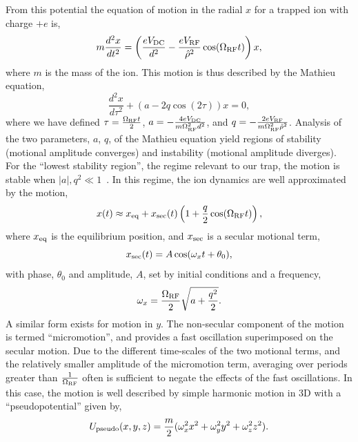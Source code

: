From this potential the equation of motion in the radial $x$ for a trapped ion with charge $+e$ is,
\begin{equation}
    m\frac{d^2x}{d t^2} =  \left(\frac{eV_{\rm DC}}{d^2}-\frac{eV_{\rm RF}}{\hat\rho^2}\cos(\Omega_{\rm RF}t)\right)x,
\end{equation}
where $m$ is the mass of the ion. This motion is thus described by the Mathieu equation,
\begin{equation}
    \frac{d^2x}{d \tau^2} + (a - 2q\cos(2\tau))x = 0,
\end{equation}
where we have defined $\tau = \frac{\Omega_{\rm RF}t}{2}$, $a=-\frac{4eV_{\rm DC}}{m\Omega_{\rm RF}^2d^2}$, and $q=-\frac{2eV_{\rm RF}}{m\Omega_{\rm RF}^2\hat\rho^2}$. 
Analysis of the two parameters, $a$, $q$, of the Mathieu equation yield regions of stability (motional amplitude converges) and instability (motional amplitude diverges). For the ``lowest stability region'', the regime relevant to our trap, the motion is stable when $|a|,q^2\ll 1$~\cite{leibfried_quantum_2003}.
In this regime, the ion dynamics are well approximated by the motion,
\begin{equation}
    x(t) \approx x_{\rm eq} +  x_{\rm sec}(t)\left(1+\frac{q}{2}\cos(\Omega_{\rm RF}t)\right),
\end{equation}
where $x_{\rm eq}$ is the equilibrium position, and $x_{\rm sec}$ is a secular motional term,
\begin{equation}
    \label{eqn:secular}
    x_{\rm sec}(t) = A\cos(\omega_{x}t+\theta_0),
\end{equation}
with phase, $\theta_0$ and amplitude, $A$, set by initial conditions and a frequency, 
\begin{equation}
    \omega_{x} = \frac{\Omega_{\rm RF}}{2}\sqrt{a + \frac{q^2}{2}}.
\end{equation}
A similar form exists for motion in $y$. The non-secular component of the motion is termed ``micromotion'', and provides a fast oscillation superimposed on the secular motion. 
Due to the different time-scales of the two motional terms, and the relatively smaller amplitude of the micromotion term, averaging over periods greater than $\frac{1}{\Omega_{\rm RF}}$ often is sufficient to negate the effects of the fast oscillations. In this case, the motion is well described by simple harmonic motion in 3D with a ``pseudopotential'' given by,
\begin{equation}
    U_{\rm pseudo}(x,y,z) = \frac{m}{2}(\omega_{ x}^2 x^2 + \omega_{ y}^2 y^2 + \omega_{ z}^2 z^2).
\end{equation}
